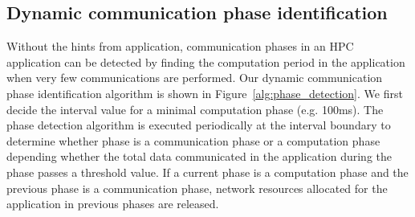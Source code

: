 \begin{comment}
Communications in different phases do not happen at the same time. As such, network
resources (such as communication channels) can be allocated
independently in different phases.
Hence, accurately identifying communication phases can improve
the SDN support for HPC applications. Traditionally SDN schemes such
as the Hedera's threshold-based scheme automatically detect communication
changes when the flow statistics are collected and processed. However,
the granularity of such detection is the same as that for flow statistics
collection and processing, and network reconfiguration,
which is in the order in seconds. Such a coarse granularity is ineffective
for tightly coupled HPC applications whose phases can change in
subseconds or even submilliseconds. 
\end{comment}


\subsection{Dynamic communication phase identification}

\begin{comment}
 Flow information used to
classify elephant flows in current phase should ignore the flow information for the flows in the
previous phase as these two set of flows  don't occur together.
In order to
determine if the network is in a communication phase, the network must be
probed at intervals smaller than the polling interval to check if data is being
sent above a certain threshold. If it is, then the network is in a
communication phase; otherwise, it is mostly in a computation phase.
If the
network transitions from a computation phase to a communication phase or vice versa during
probing, previous flow paths for elephant flows are disregarded, and the flow
informations for each flow in the current phase is considered for
prediction. 
\end{comment}

Without the hints from application, communication phases in an HPC
application can be detected by finding the computation period in the
application when very few communications are performed. 
Our dynamic communication phase identification algorithm
is shown in Figure~\ref{alg:phase_detection}. We first decide the interval
value for a minimal computation phase (e.g. 100ms). The phase detection
algorithm is executed periodically at the interval boundary to determine
whether phase is a communication phase or a computation phase depending
whether the total data communicated in the application during the phase
passes a threshold value. If a current phase is a computation phase and
the previous phase is a communication phase, network resources allocated
for the application in previous phases are released. 


